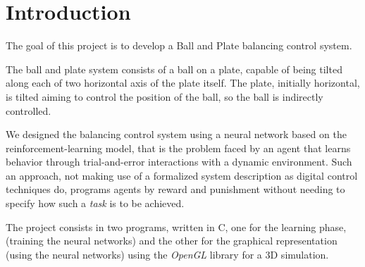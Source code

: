 

\section{Introduction}
\label{sec:intro}

The goal of this project is to develop a Ball and Plate balancing control
system.

The ball and plate system consists of a ball on a plate, capable of being
tilted along each of two horizontal axis of the plate itself.
The plate, initially horizontal, is tilted aiming to control the
position of the ball, so the ball is indirectly controlled.

We designed the balancing control system using a neural
network based on the reinforcement-learning model, that is 
the problem faced by an agent that learns behavior
through trial-and-error interactions with a dynamic environment.
Such an approach, not making use of a formalized system description 
as digital control techniques do, programs agents by reward and
punishment without needing to specify how such a \emph{task} is to be achieved.

The project consists in two programs, written in C, one for the learning phase,
(training the neural networks) and the other for the graphical representation
(using the neural networks) using the \emph{OpenGL} library for a 3D
simulation.


 

